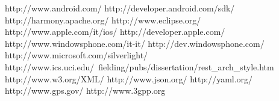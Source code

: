 
\begin{thesitography}{9}
 http://www.android.com/
 http://developer.android.com/sdk/
 http://harmony.apache.org/
 http://www.eclipse.org/
 http://www.apple.com/it/ios/
 http://developer.apple.com/
 http://www.windowsphone.com/it-it/
 http://dev.windowsphone.com/
 http://www.microsoft.com/silverlight/
 http://www.ics.uci.edu/~fielding/pubs/dissertation/rest_arch_style.htm
 http://www.w3.org/XML/
 http://www.json.org/
 http://yaml.org/
 http://www.gps.gov/
 http://www.3gpp.org
\end{thesitography}

\clearpage{\pagestyle{empty}\cleardoublepage}
